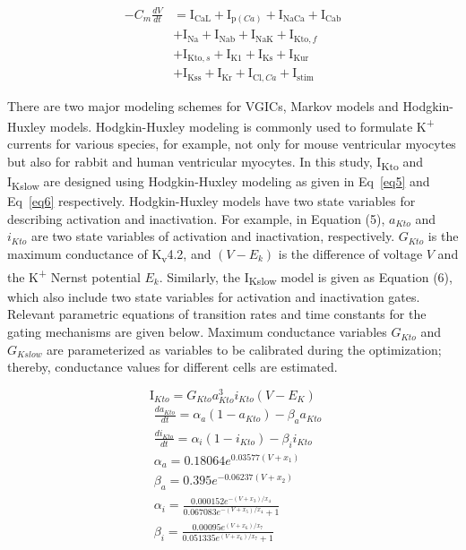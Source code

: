 \documentclass[10pt,letterpaper]{article}
\begin{document}
\begin{equation}
    \begin{split}
    -C_{m}\frac{dV}{dt} &= \mathrm{I}_{\mathrm{CaL}}+\mathrm{I}_{\mathrm{p}(Ca)}+\mathrm{I}_{\mathrm{NaCa}}+\mathrm{I}_{\mathrm{Cab}}\\
    &+\mathrm{I}_{\mathrm{Na}}+\mathrm{I}_{\mathrm{Nab}}+\mathrm{I}_{\mathrm{NaK}}+\mathrm{I}_{\mathrm{Kto},f}\\
    &+\mathrm{I}_{\mathrm{Kto},s}+\mathrm{I}_{\mathrm{K1}}+\mathrm{I}_{\mathrm{Ks}}+\mathrm{I}_{\mathrm{Kur}}\\
    &+\mathrm{I}_{\mathrm{Kss}}+\mathrm{I}_{\mathrm{Kr}}+\mathrm{I}_{\mathrm{Cl},Ca}+\mathrm{I}_{\mathrm{stim}}
    \end{split}
    \label{eq4}
\end{equation}

There are two major modeling schemes for VGICs, Markov models and Hodgkin-Huxley models. Hodgkin-Huxley modeling is commonly used to formulate K\textsuperscript{+} currents for various species, for example, not only for mouse ventricular myocytes but also for rabbit and human ventricular myocytes. In this study, I\textsubscript{Kto} and I\textsubscript{Kslow} are designed using Hodgkin-Huxley modeling as given in Eq~\ref{eq5} and Eq~\ref{eq6} respectively. Hodgkin-Huxley models have two state variables for describing activation and inactivation. For example, in Equation (5), $a_{Kto}$ and $i_{Kto}$ are two state variables of activation and inactivation, respectively. $G_{Kto}$ is the maximum conductance of K\textsubscript{v}4.2, and $(V-E_k)$ is the difference of voltage $V$ and the K\textsuperscript{+} Nernst potential $E_k$. Similarly, the I\textsubscript{Kslow} model is given as Equation (6), which also include two state variables for activation and inactivation gates. Relevant parametric equations of transition rates and time constants for the gating mechanisms are given below. Maximum conductance variables $G_{Kto}$ and $G_{Kslow}$ are parameterized as variables to be calibrated during the optimization; thereby, conductance values for different cells are estimated.

\begin{equation}
    \mathrm{I}_{Kto} = G_{Kto}a_{Kto}^{3}i_{Kto}(V-E_K)
    \label{eq5}
\end{equation}
\begin{align*}
    &\frac{da_{Kto}}{dt} = \alpha_{a}(1-a_{Kto}) - \beta_{a}a_{Kto} \\
    &\frac{di_{Kto}}{dt} = \alpha_i(1-i_{Kto}) - \beta_i i_{Kto} \\
    &\alpha_a = 0.18064 e^{0.03577(V+x_1)} \\
    &\beta_a = 0.395 e^{-0.06237(V+x_2)} \\
    &\alpha_i = \frac{0.000152 e^{-(V+x_3)/x_4}}{0.067083 e^{-(V + x_5)/x_4} + 1} \\
    &\beta_i = \frac{0.00095 e^{(V+x_6)/x_7}}{0.051335 e^{(V+x_6)/x_7} + 1} \\
\end{align*}
\end{document}
